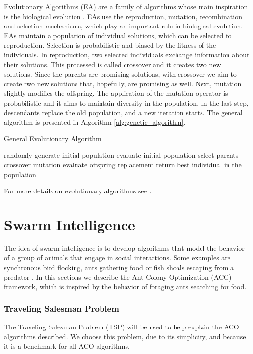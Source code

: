 			Evolutionary Algorithms (EA) are a family of algorithms whose main inspiration is the biological evolution \cite{eiben03}. EAs use the reproduction, mutation, recombination and selection mechanisms, which play an important role in biological evolution.	
			EAs maintain a population of individual solutions, which can be selected to reproduction. Selection is probabilistic and biased by the fitness of the individuals. In reproduction, two selected individuals exchange information about their solutions. This processed is called crossover and it creates two new solutions. Since the parents are promising solutions, with crossover we aim to create two new solutions that, hopefully, are promising as well. 
			Next, mutation slightly modifies the offspring. The application of the mutation operator is probabilistic and it aims to maintain diversity in the population.
			In the last step, descendants replace the old population, and a new iteration starts.
			The general algorithm is presented in Algorithm \ref{alg:genetic_algorithm}.
			\begin{algorithm}
				\caption{General Evolutionary Algorithm}
				\label{alg:genetic_algorithm}
				\begin{algorithmic}
				\STATE randomly generate initial population
				\STATE evaluate initial population
					\STATE select parents
					\STATE crossover
					\STATE mutation
					\STATE evaluate offspring
					\STATE replacement
				\ENDWHILE
				\STATE return best individual in the population
				\end{algorithmic}
			\end{algorithm} 
			
			For more details on evolutionary algorithms see \cite{eiben03}.
			
		\section{Swarm Intelligence}
		\label{subsec:swarm_intelligence}
		The idea of swarm intelligence is to develop algorithms that model the behavior of a group of animals that engage in social interactions. Some examples are synchronous bird flocking, ants gathering food or fish shoals escaping from a predator \cite{si01}. In this sections we describe the Ant Colony Optimization (ACO) framework, which is inspired by the behavior of foraging ants searching for food.
		
		\subsubsection*{Traveling Salesman Problem}
		 The Traveling Salesman Problem (TSP) will be used to help explain the ACO algorithms described. We choose this problem, due to its simplicity, and because it is a benchmark for all ACO algorithms.
		
